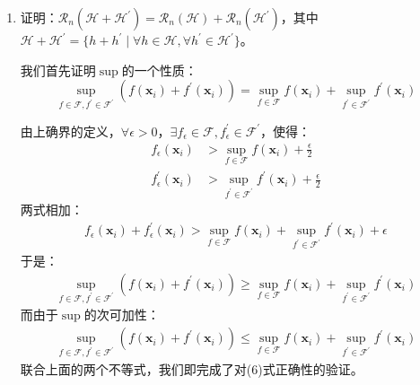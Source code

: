 \documentclass[12pt, a4paper]{article}
\newcommand{\HH}{{\mathcal{H}}}
\newcommand{\RR}{{\mathcal{R}}}
\begin{document}
\begin{enumerate}
        命题得证。

    \item 证明：$\RR_n(\HH + \HH^\prime) = \RR_n(\HH) + \RR_n(\HH^\prime)$，其中$\HH + \HH^\prime = \{h + h^\prime \mid \forall h \in \HH, \forall h^\prime \in \HH^\prime\}$。

        我们首先证明$\sup$的一个性质：
        \begin{equation}
        \sup_{f \in \mathcal{F}, f^\prime \in \mathcal{F}^\prime} (f(\bm{x}_i) + f^\prime(\bm{x}_i)) = \sup_{f \in \mathcal{F}} f(\bm{x}_i) + \sup_{f^\prime \in \mathcal{F}^\prime} f^\prime(\bm{x}_i)
        \end{equation}

        由上确界的定义，$\forall \epsilon > 0$，$\exists f_\epsilon \in \mathcal{F}, f^\prime_\epsilon \in \mathcal{F}^\prime$，使得：
        \begin{align*}
        f_\epsilon(\bm{x}_i) &> \sup_{f \in \mathcal{F}} f(\bm{x}_i) + \frac{\epsilon}{2} \\
        f^\prime_\epsilon(\bm{x}_i) &> \sup_{f^\prime \in \mathcal{F}^\prime} f^\prime(\bm{x}_i) + \frac{\epsilon}{2}
        \end{align*}
        两式相加：
        \begin{align*}
        f_\epsilon(\bm{x}_i) + f^\prime_\epsilon(\bm{x}_i) > \sup_{f \in \mathcal{F}} f(\bm{x}_i) + \sup_{f^\prime \in \mathcal{F}^\prime} f^\prime(\bm{x}_i) + \epsilon
        \end{align*}
        于是：
        \begin{align*}
        \sup_{f \in \mathcal{F}, f^\prime \in \mathcal{F}^\prime} (f(\bm{x}_i) + f^\prime(\bm{x}_i)) \ge \sup_{f \in \mathcal{F}} f(\bm{x}_i) + \sup_{f^\prime \in \mathcal{F}^\prime} f^\prime(\bm{x}_i)
        \end{align*}
        而由于$\sup$的次可加性：
        \begin{align*}
        \sup_{f \in \mathcal{F}, f^\prime \in \mathcal{F}^\prime} (f(\bm{x}_i) + f^\prime(\bm{x}_i)) \le \sup_{f \in \mathcal{F}} f(\bm{x}_i) + \sup_{f^\prime \in \mathcal{F}^\prime} f^\prime(\bm{x}_i)
        \end{align*}
        联合上面的两个不等式，我们即完成了对(6)式正确性的验证。


\end{enumerate}
\end{document}
